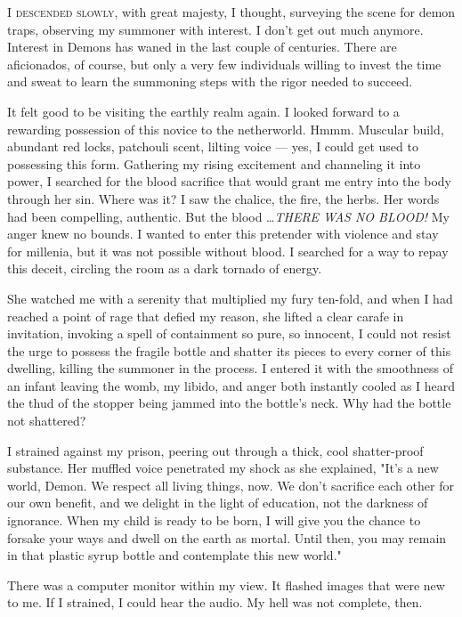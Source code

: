 
\lettrine{I}{ descended slowly,} with great majesty, I thought, surveying the scene
for demon traps, observing my summoner with interest. I don't get out
much anymore. Interest in Demons has waned in the last couple of
centuries. There are aficionados, of course, but only a very few
individuals willing to invest the time and sweat to learn the summoning
steps with the rigor needed to succeed.

It felt good to be visiting the earthly realm again. I looked forward to
a rewarding possession of this novice to the netherworld. Hmmm. Muscular
build, abundant red locks, patchouli scent, lilting voice --- yes, I could
get used to possessing this form. Gathering my rising excitement and
channeling it into power, I searched for the blood sacrifice that would
grant me entry into the body through her sin. Where was it? I saw the
chalice, the fire, the herbs. Her words had been compelling, authentic.
But the blood \ldots \emph{THERE WAS NO BLOOD!} My anger knew no bounds. I
wanted to enter this pretender with violence and stay for millenia, but
it was not possible without blood. I searched for a way to repay this
deceit, circling the room as a dark tornado of energy.

She watched me with a serenity that multiplied my fury ten-fold, and
when I had reached a point of rage that defied my reason, she lifted a
clear carafe in invitation, invoking a spell of containment so pure, so
innocent, I could not resist the urge to possess the fragile bottle and
shatter its pieces to every corner of this dwelling, killing the
summoner in the process. I entered it with the smoothness of an infant
leaving the womb, my libido, and anger both instantly cooled as I heard
the thud of the stopper being jammed into the bottle's neck. Why had the
bottle not shattered?

I strained against my prison, peering out through a thick, cool
shatter-proof substance. Her muffled voice penetrated my shock as she
explained, "It's a new world, Demon. We respect all living things, now.
We don't sacrifice each other for our own benefit, and we delight in the
light of education, not the darkness of ignorance. When my child is
ready to be born, I will give you the chance to forsake your ways and
dwell on the earth as mortal. Until then, you may remain in that plastic
syrup bottle and contemplate this new world."

There was a computer monitor within my view. It flashed images that were
new to me. If I strained, I could hear the audio. My hell was not
complete, then.
